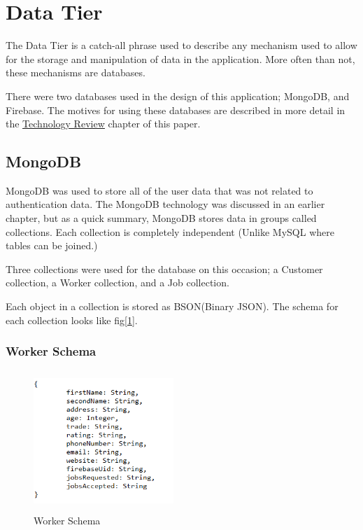 \section{Data Tier}
\label{sec:SystemDesignDataTier}

\bigskip

The Data Tier is a catch-all phrase used to describe any mechanism used to allow for the storage and manipulation of data in the application. More often than not, these mechanisms are databases. 

There were two databases used in the design of this application; MongoDB, and Firebase.
The motives for using these databases are described in more detail in the \hyperref[sec:TechnologyReview]{\underline{Technology Review}} chapter of this paper.


\subsection{MongoDB}
\label{sec:SystemDesignMongoDB}

\bigskip

MongoDB was used to store all of the user data that was not related to authentication data. The MongoDB technology was discussed in an earlier chapter, but as a quick summary, MongoDB stores data in groups called collections. Each collection is completely independent (Unlike MySQL where tables can be joined.) 

\bigskip

Three collections were used for the database on this occasion; a Customer collection, a Worker collection, and a Job collection. 

Each object in a collection is stored as BSON(Binary JSON). The schema for each collection looks like fig[\ref{fig:workerSchema}]. 

\subsubsection{Worker Schema}
\label{sec:SystemDesignWorkerSchema}

\begin{figure}[H]
    \centering
    \includegraphics[width=150pt, height=150pt]{DesignImages/WorkerSchema.PNG}
    \caption{Worker Schema}
    \label{fig:workerSchema}
\end{figure}

